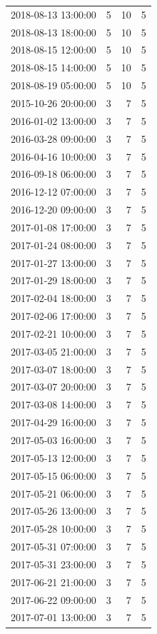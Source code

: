 \begin{tabular}{lrrr}
2018-08-13 13:00:00 & 5 & 10 & 5 \\
2018-08-13 18:00:00 & 5 & 10 & 5 \\
2018-08-15 12:00:00 & 5 & 10 & 5 \\
2018-08-15 14:00:00 & 5 & 10 & 5 \\
2018-08-19 05:00:00 & 5 & 10 & 5 \\
2015-10-26 20:00:00 & 3 & 7 & 5 \\
2016-01-02 13:00:00 & 3 & 7 & 5 \\
2016-03-28 09:00:00 & 3 & 7 & 5 \\
2016-04-16 10:00:00 & 3 & 7 & 5 \\
2016-09-18 06:00:00 & 3 & 7 & 5 \\
2016-12-12 07:00:00 & 3 & 7 & 5 \\
2016-12-20 09:00:00 & 3 & 7 & 5 \\
2017-01-08 17:00:00 & 3 & 7 & 5 \\
2017-01-24 08:00:00 & 3 & 7 & 5 \\
2017-01-27 13:00:00 & 3 & 7 & 5 \\
2017-01-29 18:00:00 & 3 & 7 & 5 \\
2017-02-04 18:00:00 & 3 & 7 & 5 \\
2017-02-06 17:00:00 & 3 & 7 & 5 \\
2017-02-21 10:00:00 & 3 & 7 & 5 \\
2017-03-05 21:00:00 & 3 & 7 & 5 \\
2017-03-07 18:00:00 & 3 & 7 & 5 \\
2017-03-07 20:00:00 & 3 & 7 & 5 \\
2017-03-08 14:00:00 & 3 & 7 & 5 \\
2017-04-29 16:00:00 & 3 & 7 & 5 \\
2017-05-03 16:00:00 & 3 & 7 & 5 \\
2017-05-13 12:00:00 & 3 & 7 & 5 \\
2017-05-15 06:00:00 & 3 & 7 & 5 \\
2017-05-21 06:00:00 & 3 & 7 & 5 \\
2017-05-26 13:00:00 & 3 & 7 & 5 \\
2017-05-28 10:00:00 & 3 & 7 & 5 \\
2017-05-31 07:00:00 & 3 & 7 & 5 \\
2017-05-31 23:00:00 & 3 & 7 & 5 \\
2017-06-21 21:00:00 & 3 & 7 & 5 \\
2017-06-22 09:00:00 & 3 & 7 & 5 \\
2017-07-01 13:00:00 & 3 & 7 & 5 \\

\end{tabular}
